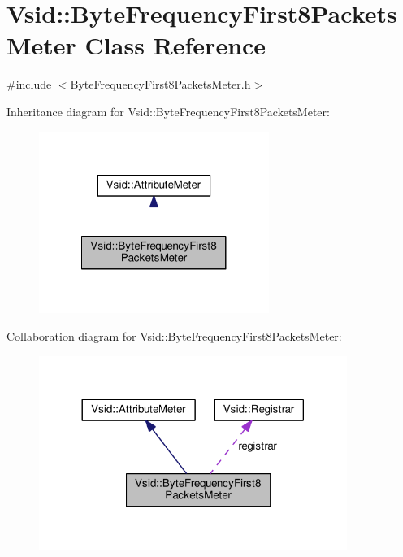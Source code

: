 \hypertarget{class_vsid_1_1_byte_frequency_first8_packets_meter}{\section{Vsid\-:\-:Byte\-Frequency\-First8\-Packets\-Meter Class Reference}
\label{class_vsid_1_1_byte_frequency_first8_packets_meter}
}


{\ttfamily \#include $<$Byte\-Frequency\-First8\-Packets\-Meter.\-h$>$}



Inheritance diagram for Vsid\-:\-:Byte\-Frequency\-First8\-Packets\-Meter\-:
\nopagebreak
\begin{figure}[H]
\begin{center}
\leavevmode
\includegraphics[width=212pt]{class_vsid_1_1_byte_frequency_first8_packets_meter__inherit__graph}
\end{center}
\end{figure}


Collaboration diagram for Vsid\-:\-:Byte\-Frequency\-First8\-Packets\-Meter\-:
\nopagebreak
\begin{figure}[H]
\begin{center}
\leavevmode
\includegraphics[width=284pt]{class_vsid_1_1_byte_frequency_first8_packets_meter__coll__graph}
\end{center}
\end{figure}
